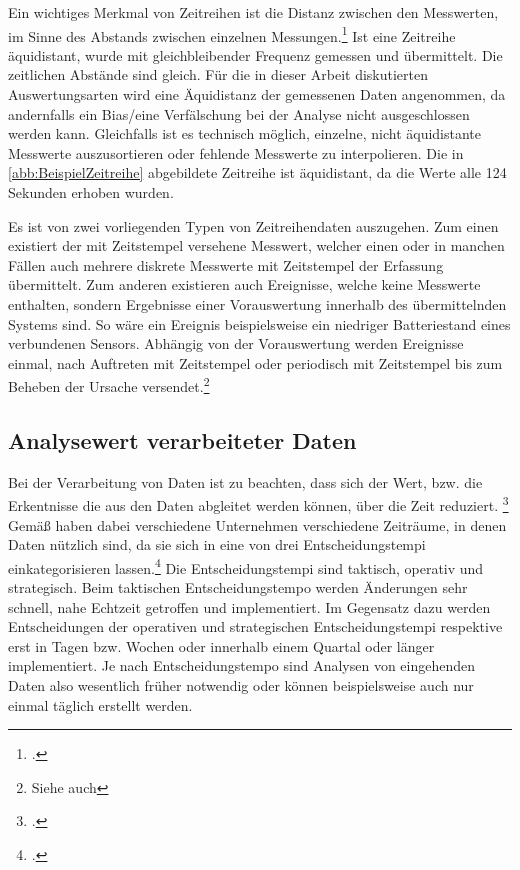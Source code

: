 Ein wichtiges Merkmal von Zeitreihen ist die Distanz zwischen den Messwerten, im Sinne des Abstands zwischen einzelnen Messungen.\footcite[Vgl. auch im Folgenden][201\psq]{Mosler.2006} Ist eine Zeitreihe äquidistant, wurde mit gleichbleibender Frequenz gemessen und übermittelt. Die zeitlichen Abstände sind gleich. Für die in dieser Arbeit diskutierten Auswertungsarten wird eine Äquidistanz der gemessenen Daten angenommen, da andernfalls ein Bias/eine Verfälschung bei der Analyse nicht ausgeschlossen werden kann. Gleichfalls ist es technisch möglich, einzelne, nicht äquidistante Messwerte auszusortieren oder fehlende Messwerte zu interpolieren. Die in \autoref{abb:BeispielZeitreihe} abgebildete Zeitreihe ist äquidistant, da die Werte alle 124 Sekunden erhoben wurden.

Es ist von zwei vorliegenden Typen von Zeitreihendaten auszugehen. Zum einen existiert der mit Zeitstempel versehene Messwert, welcher einen oder in manchen Fällen auch mehrere diskrete Messwerte mit Zeitstempel der Erfassung übermittelt. 
Zum anderen existieren auch Ereignisse, welche keine Messwerte enthalten, sondern Ergebnisse einer Vorauswertung innerhalb des übermittelnden Systems sind. 
So wäre ein Ereignis beispielsweise ein niedriger Batteriestand eines verbundenen Sensors. 
Abhängig von der Vorauswertung werden Ereignisse einmal, nach Auftreten mit Zeitstempel oder periodisch mit Zeitstempel bis zum Beheben der Ursache versendet.\footnote{Siehe auch }

\subsection{Analysewert verarbeiteter Daten}\label{chap:datenwert}

Bei der Verarbeitung von Daten ist zu beachten, dass sich der Wert, bzw. die Erkentnisse die aus den Daten abgleitet werden können, über die Zeit reduziert. \footcite[Vgl. auch im Folgenden][]{NucleusResarchInc..2012} Gemäß \citeauthor{NucleusResarchInc..2012} haben dabei verschiedene Unternehmen verschiedene Zeiträume, in denen Daten nützlich sind, da sie sich in eine von drei Entscheidungstempi einkategorisieren lassen.\footcite[Vgl. auch im Folgenden][3]{NucleusResarchInc..2012} Die Entscheidungstempi sind taktisch, operativ und strategisch. Beim taktischen Entscheidungstempo werden Änderungen sehr schnell, nahe Echtzeit getroffen und implementiert. Im Gegensatz dazu werden Entscheidungen der operativen und strategischen Entscheidungstempi respektive erst in Tagen bzw. Wochen oder innerhalb einem Quartal oder länger implementiert. Je nach Entscheidungstempo sind Analysen von eingehenden Daten also wesentlich früher notwendig oder können beispielsweise auch nur einmal täglich erstellt werden.

